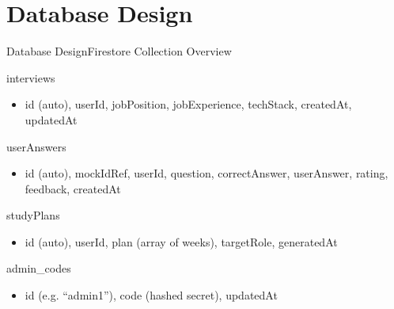 \documentclass{beamer}
\begin{document}
\section{Database Design}
\begin{frame}{Database Design}{Firestore Collection Overview}
\scriptsize
\begin{block}{interviews}
\begin{itemize}
    \item id (auto), userId, jobPosition, jobExperience, techStack, createdAt, updatedAt
\end{itemize}
\end{block}

\begin{block}{userAnswers}
\begin{itemize}
    \item id (auto), mockIdRef, userId, question, correctAnswer, userAnswer, rating, feedback, createdAt
\end{itemize}
\end{block}

\begin{block}{studyPlans}
\begin{itemize}
    \item id (auto), userId, plan (array of weeks), targetRole, generatedAt
\end{itemize}
\end{block}

\begin{block}{admin\_codes}
\begin{itemize}
    \item id (e.g. ``admin1''), code (hashed secret), updatedAt
\end{itemize}
\end{block}
\end{frame}
\end{document}
